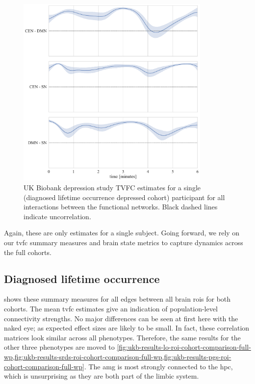 \begin{figure}[ht]
  \centering
  \includegraphics[width=0.85\textwidth]{fig/ukbiobank/TVFC_predictions/FN/correlation_UKB1000211_TVFC_predictions}
  \caption{
    UK Biobank depression study TVFC estimates for a single (diagnosed lifetime occurrence depressed cohort) participant for all interactions between the functional networks.
    Black dashed lines indicate uncorrelation.
  }
  \label{fig:ukbiobank-example-correlation-estimates-fn}
\end{figure}


Again, these are only estimates for a single subject.
Going forward, we rely on our \gls{tvfc} summary measures and brain state metrics to capture dynamics across the full cohorts.

\subsection{Diagnosed lifetime occurrence}

 shows these summary measures for all edges between all brain \glspl{roi} for both cohorts.
The mean \gls{tvfc} estimates give an indication of population-level connectivity strengths.
No major differences can be seen at first here with the naked eye; as expected effect sizes are likely to be small.
In fact, these correlation matrices look similar across all phenotypes.
Therefore, the same results for the other three phenotypes are moved to \cref{fig:ukb-results-lo-roi-cohort-comparison-full-wp,fig:ukb-results-srds-roi-cohort-comparison-full-wp,fig:ukb-results-pgs-roi-cohort-comparison-full-wp}.
The \gls{amg} is most strongly connected to the \gls{hpc}, which is unsurprising as they are both part of the limbic system.


